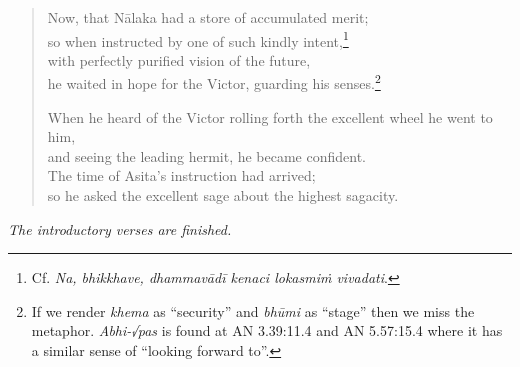 \documentclass[12pt,openany]{book}%
\newcommand*{\scendsection}[1]{\begin{center}\textit{#1}\end{center}}
\begin{document}
\begin{verse}
Now, that \textsanskrit{Nālaka} had a store of accumulated merit; \\
so when instructed by one of such kindly intent,\footnote{Cf. \textit{Na, bhikkhave, \textsanskrit{dhammavādī} kenaci \textsanskrit{lokasmiṁ} vivadati}. } \\
with perfectly purified vision of the future, \\
he waited in hope for the Victor, guarding his senses.\footnote{If we render \textit{khema} as “security” and \textit{\textsanskrit{bhūmi}} as “stage” then we miss the metaphor. \textit{Abhi-√pas} is found at AN 3.39:11.4 and AN 5.57:15.4 where it has a similar sense of “looking forward to”. } 

When he heard of the Victor rolling forth the excellent wheel he went to him, \\
and seeing the leading hermit, he became confident. \\
The time of Asita’s instruction had arrived; \\
so he asked the excellent sage about the highest sagacity. 

%
\end{verse}

\scendsection{The introductory verses are finished. }
\end{document}
